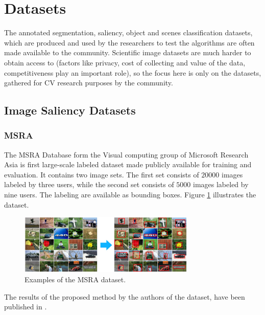 \section{Datasets}
\label{sec:db}

The annotated segmentation, saliency, object and scenes classification datasets, which are produced and used by the researchers to test the algorithms are often made available to the community. Scientific image datasets are much harder to obtain access to (factors like privacy, cost of collecting and value of the data, competitiveness play an important role), so the focus here is only on the datasets, gathered for CV research purposes by the community.

\subsection{Image Saliency Datasets}
\subsubsection{MSRA}\label{subsec:msra}
The MSRA  Database form the Visual computing group of Microsoft Research Asia \cite{msra_db} is  first large-scale labeled dataset made publicly available for training and evaluation. It contains two image sets. The first set consists of $20 000$ images labeled by three users, while the second set consists of $5000$ images labeled by nine users. The labeling are available as bounding boxes. Figure \ref{fig:msra} illustrates the dataset.
\begin{figure}[H]
\begin{center}
\includegraphics[width=0.75\textwidth]{fig/MSRA}
\end{center}
\caption{Examples of the MSRA dataset.}
\label{fig:msra}
\end{figure}

The results of the proposed method by the authors of the dataset, have been published in \cite{LiuCVPR2007}.

